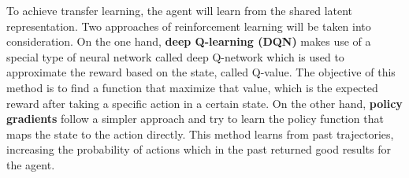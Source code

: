 To achieve transfer learning, the agent will learn from the shared latent representation. 
Two approaches of reinforcement learning will be taken into consideration. On the one hand, \textbf{deep Q-learning (DQN)} makes use of a special type of neural network called deep Q-network which is used to approximate the reward based on the state, called Q-value. The objective of this method is to find a function that maximize that value, which is the expected reward after taking a specific action in a certain  state. On the other hand, \textbf{policy gradients} follow a simpler approach and try to learn the policy function that maps the state to the action directly. This method learns from past trajectories, increasing the probability of actions which in the past returned good results for the agent.




